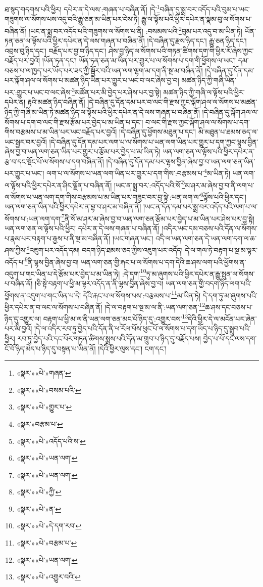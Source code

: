 ཐ་སྙད་གདགས་པའི་ཕྱིར། དཔེར་ན་དེ་ལས་:གཞན་པ་བཞིན་ནོ། །དེ་\footnote{«སྣར་»«པེ་»གཞན་}བཞིན་དུ་སྨྲ་བར་འདོད་པའི་བུམ་པ་ཡང་གཟུགས་ལ་སོགས་པས་འདུ་བའི་རྒྱུ་ཅན་མ་ཡིན་པར་ངེས་ཏེ། རྒྱུ་ལ་ལྟོས་པའི་ཕྱིར་དཔེར་ན་སྣམ་བུ་ལ་སོགས་པ་བཞིན་ནོ། །ཡང་ན་སྨྲ་བར་འདོད་པའི་གཟུགས་ལ་སོགས་པ་ནི། :བསམས་པའི་\footnote{«སྣར་»«པེ་»བསམ་པའི་}བུམ་པར་འདུ་བ་མ་ཡིན་ཏེ། ཡོན་ཏན་ཅན་ལ་ལྟོས་པའི་ཕྱིར་དཔེར་ན་དེ་ལས་གཞན་པ་བཞིན་ནོ། །དེ་བཞིན་དུ་རྫས་ཉིད་དང་། རྒྱུ་ཅན་ཉིད་དང་། འབྲས་བུ་ཉིད་དང་། བརྗོད་པར་བྱ་བ་ཉིད་དང་། ཤེས་བྱ་ཉིད་ལ་སོགས་པའི་གཏན་ཚིགས་དག་གི་ཕྱིར་རོ་ཞེས་ཀྱང་བརྗོད་པར་བྱའོ། །ཡོན་ཏན་དང་། ཡོན་ཏན་ཅན་མ་ཡིན་པར་གྱུར་པ་ལ་སོགས་པ་དག་གི་ཕྱོགས་ལ་ཡང་། དམ་བཅས་པ་ལ་ཁྱད་པར་ཡོད་པར་ཟད་ཀྱི་སྦྱོར་བའི་ཡན་ལག་ལྷག་མ་དག་ནི་སྔ་མ་བཞིན་ནོ། །དེ་བཞིན་དུ་དོན་དམ་པར་ལྐོག་ཤལ་ལ་སོགས་པ་མཚན་ཉིད་ཡིན་པར་གྱུར་པ་ཡང་བ་ལང་ཞེས་བྱ་བ། མཚན་ཉིད་ཀྱི་གཞི་ཡིན་པར་:གྱུར་པ་ཡང་བ་ལང་ཞེས་\footnote{«སྣར་»«པེ་»གྱུར་པ་}མཚོན་པར་མི་བྱེད་པར་ཤེས་པར་བྱ་སྟེ། མཚན་ཉིད་ཀྱི་གཞི་ལ་ལྟོས་པའི་ཕྱིར་དཔེར་ན། རྟའི་མཚན་ཉིད་བཞིན་ནོ། །དེ་བཞིན་དུ་དོན་དམ་པར་བ་ལང་གི་རྫས་ཀྱང་ལྐོག་ཤལ་ལ་སོགས་པ་མཚན་ཉིད་ཀྱི་གཞི་མ་ཡིན་ཏེ་མཚན་ཉིད་ལ་ལྟོས་པའི་ཕྱིར་དཔེར་ན་དེ་ལས་གཞན་པ་བཞིན་ནོ། །དེ་བཞིན་དུ་ལྐོག་ཤལ་ལ་སོགས་པ་དག་བ་ལང་གི་རྫས་རྩོམ་པར་བྱེད་པ་མ་ཡིན་པ་དང་། བ་ལང་གི་རྫས་ཀྱང་ལྐོག་ཤལ་ལ་སོགས་པ་དག་གིས་བརྩམས་པ་མ་ཡིན་པར་ཡང་བརྗོད་པར་བྱའོ། །དེ་བཞིན་དུ་ཕྱོགས་མཐུན་པ་དང་། མི་མཐུན་པ་ཐམས་ཅད་ལ་ཡང་སྦྱར་བར་བྱའོ། །དེ་བཞིན་དུ་དོན་དམ་པར་ལག་པ་ལ་སོགས་པ་ཡན་ལག་ཡིན་པར་གྱུར་པ་དག་ཀྱང་ལྷས་བྱིན་ཞེས་བྱ་བ་ཡན་ལག་ཅན་ཡིན་པར་གྱུར་པ་རྩོམ་པར་བྱེད་པ་མ་ཡིན་ཏེ། ཡན་ལག་ཅན་ལ་ལྟོས་པའི་ཕྱིར་དཔེར་ན་རྩ་བ་དང་སྡོང་པོ་ལ་སོགས་པ་དག་བཞིན་ནོ། །དེ་བཞིན་དུ་དོན་དམ་པར་ལྷས་བྱིན་ཞེས་བྱ་བ་ཡན་ལག་ཅན་ཡིན་པར་གྱུར་པ་ཡང་། ལག་པ་ལ་སོགས་པ་ཡན་ལག་ཡིན་པར་གྱུར་པ་དག་གིས་:བརྩམས་པ་\footnote{«སྣར་»བརྩམ་པ་}མ་ཡིན་ཏེ། ཡན་ལག་ལ་ལྟོས་པའི་ཕྱིར་དཔེར་ན་ཤིང་ལྗོན་པ་བཞིན་ནོ། །ཡང་ན་སྨྲ་བར་:འདོད་པའི་སོ་\footnote{«སྣར་»«པེ་»འདོད་པའི་ས་}མ་ཤར་མ་ཞེས་བྱ་བ་ནི་ལག་པ་ལ་སོགས་པ་ཡན་ལག་དག་གིས་བརྩམས་པ་མ་ཡིན་པར་གཟུང་བར་བྱ་སྟེ་:ཡན་ལག་ལ་\footnote{«སྣར་»«པེ་»ཡན་ལག་}ལྟོས་པའི་ཕྱིར་དང་། ཡན་ལག་ཅན་ཡིན་པའི་ཕྱིར་དཔེར་ན་བྷ་བ་ཤར་མ་བཞིན་ནོ། །ཡང་ན་དོན་དམ་པར་སྨྲ་བར་འདོད་པའི་ལག་པ་ལ་སོགས་པ་:ཡན་ལག་དག་\footnote{«སྣར་»«པེ་»ཡན་ལག་}ནི་སོ་མ་ཤར་མ་ཞེས་བྱ་བ་ཡན་ལག་ཅན་རྩོམ་པར་བྱེད་པ་མ་ཡིན་པར་ཤེས་པར་བྱ་སྟེ། ཡན་ལག་ཅན་ལ་ལྟོས་པའི་ཕྱིར། དཔེར་ན་དེ་ལས་གཞན་པ་བཞིན་ནོ། །འདིར་ཡང་དམ་བཅས་པའི་དོན་ལ་སོགས་པ་རྣམ་པར་བརྟག་པ་རྒྱས་པ་ནི་སྔ་མ་བཞིན་ནོ། །ཡང་གཞན་ཡང་། འདི་ལ་ཡན་ལག་ཅན་དེ་ཡན་ལག་དག་ལ་ཆ་ཤས་ཀྱིས་\footnote{«སྣར་»«པེ་»ཀྱི་}འཇུག་པར་འདོད་དམ། བདག་ཉིད་ཐམས་ཅད་ཀྱིས་འཇུག་པར་འདོད། དེ་ལ་གལ་ཏེ་བརྟག་པ་སྔ་མ་ལྟར་འདོད་པ་\footnote{«སྣར་»«པེ་»ན་}ནི་ལྷས་བྱིན་ཞེས་བྱ་བ། ཡན་ལག་ཅན་གྱི་རྐང་པ་ལ་སོགས་པ་དག་དེའི་ཆ་ཤས་ལག་པའི་ཕྱོགས་ན་འདུག་པ་གང་ཡིན་པ་དེ་རྩོམ་པར་བྱེད་པ་མ་ཡིན་ཏེ། :དེ་དག་\footnote{«སྣར་»«པེ་»དེ་དག་རབ་}ཏུ་མ་ཞུགས་པའི་ཕྱིར་དཔེར་ན་རྒྱུ་སྤུན་ལ་སོགས་པ་བཞིན་ནོ། །ཅི་སྟེ་བརྟག་པ་ཕྱི་མ་ལྟར་འདོད་ན་ནི་ལྷས་བྱིན་ཞེས་བྱ་བ། ཡན་ལག་ཅན་གྱི་བདག་ཉིད་ལག་པའི་ཕྱོགས་ན་འདུག་པ་གང་ཡིན་པ་དེ། དེའི་རྐང་པ་ལ་སོགས་པས་:བརྩམས་པ་\footnote{«སྣར་»«པེ་»བརྩམ་པ་}མ་ཡིན་ཏེ། དེ་དག་ཏུ་མ་ཞུགས་པའི་ཕྱིར་དཔེར་ན་བ་ལང་ལ་སོགས་པ་བཞིན་ནོ། །དེ་ལ་བརྟག་པ་སྔ་མ་ལ་ནི་:ཡན་ལག་ཅན་\footnote{«སྣར་»«པེ་»ཡན་ལག་}ཆ་ཤས་དང་བཅས་པ་ཉིད་དུ་འགྱུར་ལ། བརྟག་པ་ཕྱི་མ་ལ་ནི་ཡན་ལག་ཅན་མང་པོ་ཉིད་དུ་:འགྱུར་བས་\footnote{«སྣར་»«པེ་»འགྱུར་བའི་}དེའི་ཕྱིར་དེ་ལ་མངོན་པར་ཞེན་པར་མི་བྱའོ། །དེ་ལ་འདིར་རབ་ཏུ་བྱེད་པའི་དོན་ནི་ཕ་རོལ་པོས་ཕུང་པོ་ལ་སོགས་པ་དག་ཡོད་པ་ཉིད་དུ་སྒྲུབ་པའི་ཕྱིར། རབ་ཏུ་བྱེད་པའི་དང་པོར་གཏན་ཚིགས་སྨྲས་པའི་དོན་མ་གྲུབ་པ་ཉིད་དུ་བརྗོད་པས། བྱེད་པ་པོ་དང་ལས་དག་ངོ་བོ་ཉིད་མེད་པ་ཉིད་དུ་བསྟན་པ་ཡིན་ནོ། །དེའི་ཕྱིར་ལུས་དང་། ངག་དང་། 